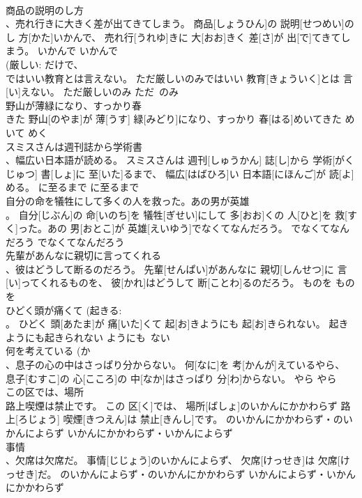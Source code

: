 \documentclass[8pt]{extreport}
\begin{document}
\begin{CJK}{UTF8}{min}
\\	商品の説明のし方 
\\	、売れ行きに大きく差が出てきてしまう。	商品[しょうひん]の 説明[せつめい]のし 方[かた]いかんで、 売れ行[うれゆ]きに 大[おお]きく 差[さ]が 出[で]てきてしまう。	いかんで	いかんで	
\\	(厳しい: だけで、
\\	ではいい教育とは言えない。	ただ厳しいのみではいい 教育[きょういく]とは 言[い]えない。	ただ厳しいのみ	ただ~のみ	
\\	野山が薄緑になり、すっかり春 
\\	きた	野山[のやま]が 薄[うす] 緑[みどり]になり、すっかり 春[はる]めいてきた	めいて	めく	
\\	スミスさんは週刊誌から学術書　
\\	、幅広い日本語が読める。	スミスさんは 週刊[しゅうかん] 誌[し]から 学術[がくじゅつ] 書[しょ]に 至[いた]るまで、 幅広[はばひろ]い 日本語[にほんご]が 読[よ]める。	に至るまで	に至るまで	
\\	自分の命を犠牲にして多くの人を救った。あの男が英雄 
\\	。	自分[じぶん]の 命[いのち]を 犠牲[ぎせい]にして 多[おお]くの 人[ひと]を 救[すく]った。あの 男[おとこ]が 英雄[えいゆう]でなくてなんだろう。	でなくてなんだろう	でなくてなんだろう	
\\	先輩があんなに親切に言ってくれる 
\\	、彼はどうして断るのだろう。	先輩[せんぱい]があんなに 親切[しんせつ]に 言[い]ってくれるものを、 彼[かれ]はどうして 断[ことわ]るのだろう。	ものを	ものを	
\\	ひどく頭が痛くて (起きる: 
\\	。	ひどく 頭[あたま]が 痛[いた]くて 起[お]きようにも 起[お]きられない。	起きようにも起きられない	ようにも~ない	
\\	何を考えている (か 
\\	、息子の心の中はさっぱり分からない。	何[なに]を 考[かんが]えているやら、 息子[むすこ]の 心[こころ]の 中[なか]はさっぱり 分[わ]からない。	やら	やら	
\\	この区では、場所 
\\	路上喫煙は禁止です。	この 区[く]では、 場所[ばしょ]のいかんにかかわらず 路上[ろじょう] 喫煙[きつえん]は 禁止[きんし]です。	のいかんにかかわらず・のいかんによらず	いかんにかかわらず・いかんによらず	
\\	事情 
\\	、欠席は欠席だ。	事情[じじょう]のいかんによらず、 欠席[けっせき]は 欠席[けっせき]だ。	のいかんによらず・のいかんにかかわらず	いかんによらず・いかんにかかわらず	

\end{CJK}
\end{document}
